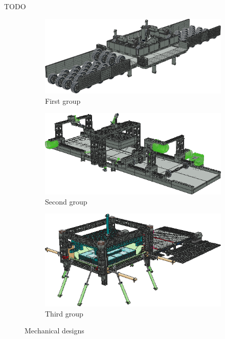 \documentclass{PDS}
\begin{document}
TODO

\begin{figure}[htbp]
    \centering
    \begin{subfigure}[b]{0.3\textwidth}
        \centering
        \includegraphics[width=\textwidth]{./figures/paper_1.png}
        \caption{First group}
        \label{fig:paper_1}
    \end{subfigure}
    \hfill
    \begin{subfigure}[b]{0.3\textwidth}
        \centering
        \includegraphics[width=\textwidth]{./figures/paper_2.png}
        \caption{Second group}
        \label{fig:paper_2}
    \end{subfigure}
    \hfill
    \begin{subfigure}[b]{0.3\textwidth}
        \centering
        \includegraphics[width=\textwidth]{./figures/paper_3.png}
        \caption{Third group}
        \label{fig:paper_3}
    \end{subfigure}
    \caption{Mechanical designs}
    \label{fig:paper}
\end{figure}
\end{document}
